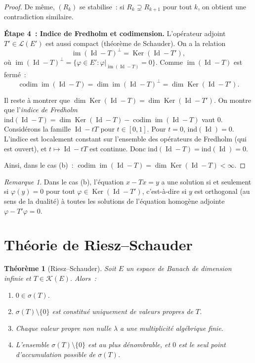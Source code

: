 \documentclass[a4paper,12pt]{book}
\DeclareMathOperator{\im}{im}
\DeclareMathOperator{\Id}{Id}
\DeclareMathOperator{\Ker}{Ker}
\DeclareMathOperator{\codim}{codim}
\theoremstyle{definition}
\theoremstyle{plain}
\newtheorem{theoreme}[definition]{Théorème}
\theoremstyle{remark}
\newtheorem{remarque}[definition]{Remarque}
\begin{document}
\begin{proof}
De même, $(R_k)$ se stabilise~: si $R_k \supsetneq R_{k+1}$ pour tout $k$, on obtient
une contradiction similaire.

\textbf{Étape 4~: Indice de Fredholm et codimension.}
L'opérateur adjoint $T' \in \mathcal{L}(E')$ est aussi compact (théorème de Schauder).
On a la relation
\[
  \im(\Id - T)^\perp = \Ker(\Id - T'),
\]
où $\im(\Id-T)^\perp = \{\varphi \in E' : \varphi|_{\im(\Id-T)} = 0\}$. Comme
$\im(\Id-T)$ est fermé~:
\[
  \codim \im(\Id-T) = \dim \im(\Id-T)^\perp = \dim \Ker(\Id - T').
\]

Il reste à montrer que $\dim \Ker(\Id - T) = \dim \Ker(\Id - T')$. On montre que
l'\emph{indice de Fredholm} $\mathrm{ind}(\Id - T) = \dim \Ker(\Id-T) - \codim \im(\Id-T)$
vaut $0$. Considérons la famille $\Id - tT$ pour $t \in [0,1]$. Pour $t = 0$,
$\mathrm{ind}(\Id) = 0$. L'indice est localement constant sur l'ensemble des opérateurs
de Fredholm (qui est ouvert), et $t \mapsto \Id - tT$ est continue. Donc
$\mathrm{ind}(\Id - T) = \mathrm{ind}(\Id) = 0$.

Ainsi, dans le cas (b)~: $\codim \im(\Id - T) = \dim \Ker(\Id - T) < \infty$.
\end{proof}

\begin{remarque}
Dans le cas (b), l'équation $x - Tx = y$ a une solution si et seulement si
$\varphi(y) = 0$ pour tout $\varphi \in \Ker(\Id - T')$, c'est-à-dire si $y$ est
orthogonal (au sens de la dualité) à toutes les solutions de l'équation homogène adjointe
$\varphi - T'\varphi = 0$.
\end{remarque}

\section{Théorie de Riesz--Schauder}

\begin{theoreme}[Riesz--Schauder]
\label{thm:riesz-schauder}
Soit $E$ un espace de Banach de dimension infinie et $T \in \mathcal{K}(E)$. Alors~:
\begin{enumerate}[label=(\roman*)]
  \item $0 \in \sigma(T)$.
  \item $\sigma(T) \setminus \{0\}$ est constitué uniquement de valeurs propres de $T$.
  \item Chaque valeur propre non nulle $\lambda$ a une multiplicité algébrique finie.
  \item L'ensemble $\sigma(T) \setminus \{0\}$ est au plus dénombrable, et $0$ est le
        seul point d'accumulation possible de $\sigma(T)$.
\end{enumerate}
\end{theoreme}
\end{document}
